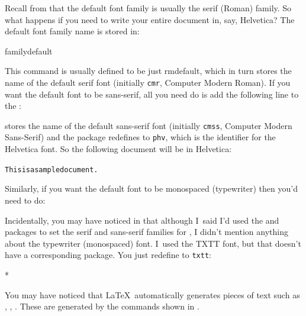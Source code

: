 Recall from  that the default font
family is usually the serif (Roman) family. So what happens if you
need to write your entire document in, say, Helvetica?  The default
font family name is stored in:
\begin{definition}
\gls{familydefault}
\end{definition}
This command is usually
defined to be just \gls{rmdefault}, which in turn stores the name of the
default serif font (initially \texttt{cmr}, Computer Modern Roman). If 
you want the default font to be sans-serif, all you
need do is add the following line to the
:
\begin{codeS}
\end{codeS}
 stores the name of the default sans-serif font (initially \texttt{cmss},
Computer Modern Sans-Serif) and
the  package redefines  to \texttt{phv},
which is the identifier for the Helvetica font.
So the following document will be in Helvetica:
\begin{alltt}


This is a sample document.
\end{alltt}
Similarly, if you want the default font to be monospaced (typewriter) then you'd need to do:
\begin{codeS}
\end{codeS}

Incidentally, you may have noticed in 
that although I~said I'd used the  and
 packages to set the serif and sans-serif families for
, I
didn't mention anything about the typewriter (monospaced) font. I~used
the TXTT font, but that doesn't have a corresponding package. You
just redefine  to \texttt{txtt}:
\begin{codeS}
*
\end{codeS}


You may have noticed that \LaTeX\ automatically generates pieces of
text such as , , .  These are
generated by the commands shown in .

